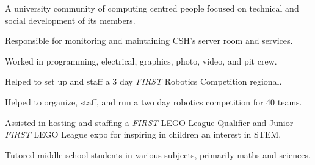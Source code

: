 \cvtag{\LaTeX}



\medskip
{}
A university community of computing centred people focused on technical and social development of its members.

Responsible for monitoring and maintaining CSH's server room and services.

\divider

Worked in programming, electrical, graphics, photo, video, and pit crew.







Helped to set up and staff a 3 day \textit{FIRST} Robotics Competition regional.

Helped to organize, staff, and run a two day robotics competition for 40 teams.

Assisted in hosting and staffing a \textit{FIRST} LEGO\textsuperscript{\textregistered} League Qualifier and Junior \textit{FIRST} LEGO League expo for inspiring in children an interest in STEM.

\divider

Tutored middle school students in various subjects, primarily maths and sciences.

